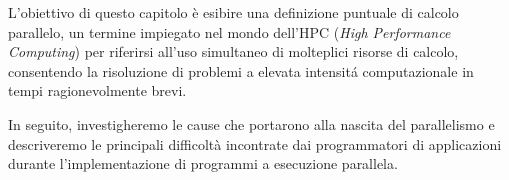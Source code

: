 L'obiettivo di questo capitolo \`e esibire una definizione puntuale di calcolo parallelo, un termine impiegato nel mondo
dell'HPC (\textit{High Performance Computing}) per riferirsi all’uso simultaneo di molteplici risorse di calcolo, consentendo la risoluzione di problemi a
elevata intensit\'a computazionale in tempi ragionevolmente brevi.

In seguito, investigheremo le cause che portarono alla nascita del parallelismo e descriveremo le principali difficolt\`a incontrate dai programmatori di
applicazioni durante l'implementazione di programmi a esecuzione parallela.